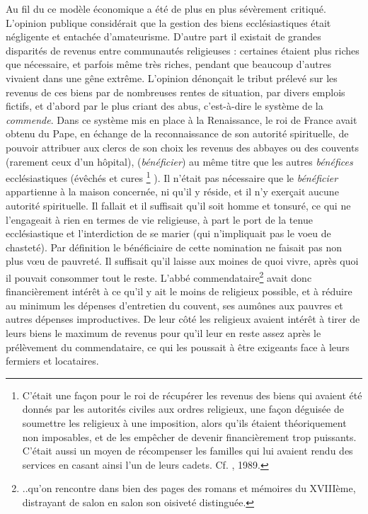  Au fil du  ce modèle économique a été de plus en plus sévèrement critiqué. L'opinion publique considérait que la gestion des biens ecclésiastiques était négligente et entachée d'amateurisme. D'autre part il existait de grandes disparités de revenus entre communautés religieuses : certaines étaient plus riches que nécessaire, et parfois même très riches, pendant que beaucoup d'autres vivaient dans une gêne extrême. L'opinion dénonçait le tribut prélevé sur les revenus de ces biens par de nombreuses rentes de situation, par divers emplois fictifs, et d'abord par le plus criant des abus, c'est-à-dire le système de la \emph{commende}. Dans ce système mis en place à la Renaissance, le roi de France avait obtenu du Pape, en échange de la reconnaissance de son autorité spirituelle, de pouvoir attribuer aux clercs de son choix les revenus des abbayes ou des couvents (rarement ceux d'un hôpital),  (\emph{bénéficier}) au même titre que les autres \emph{bénéfices} ecclésiastiques (évêchés et cures%
\footnote{C'était une façon pour le roi de récupérer les revenus des biens qui avaient été donnés par les autorités civiles aux ordres religieux, une façon déguisée de soumettre les religieux à une imposition, alors qu'ils étaient théoriquement non imposables, et de les empêcher de devenir financièrement trop puissants. C'était aussi un moyen de récompenser les familles qui lui avaient rendu des services en casant ainsi l'un de leurs cadets. Cf. , 1989.}%
). Il n'était pas nécessaire que le \emph{bénéficier} appartienne à la maison concernée, ni qu'il y réside, et il n'y exerçait aucune autorité spirituelle. Il fallait et il suffisait qu'il soit homme et tonsuré, ce qui ne l'engageait à rien en termes de vie religieuse, à part le port de la tenue ecclésiastique et l'interdiction de se marier (qui n'impliquait pas le voeu de chasteté). Par définition le bénéficiaire de cette nomination ne faisait pas non plus vœu de pauvreté. Il suffisait qu'il laisse aux moines de quoi vivre, après quoi il pouvait consommer tout le reste. L'abbé commendataire\footnote{..qu'on rencontre dans bien des pages des romans et mémoires du XVIIIème, distrayant de salon en salon son oisiveté distinguée.} avait donc financièrement intérêt à ce qu'il y ait le moins de religieux possible, et à réduire au minimum les dépenses d'entretien du couvent, ses aumônes aux pauvres et autres dépenses improductives. De leur côté les religieux avaient intérêt à tirer de leurs biens le maximum de revenus pour qu'il leur en reste assez après le prélèvement du commendataire, ce qui les poussait à être exigeants face à leurs fermiers et locataires. 

